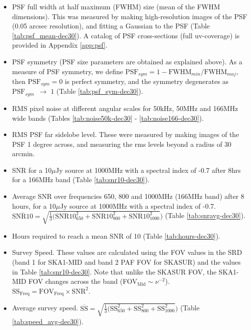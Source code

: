 \documentclass[sfheadings,a4paper,times,9pt,floats,floatfix]{article}
\begin{document}
\begin{itemize}
 \item PSF full width at half maximum (FWHM) size (mean of the FWHM dimensions). This was measured by making high-resolution
images of the PSF (0.05 arcsec resolution), and fitting a Gaussian to the PSF (Table \ref{tab:psf_mean-dec30}). A
catalog
of PSF
cross-sections (full uv-coverage) is provided in Appendix \ref{app:psf}.

 \item PSF symmetry (PSF size parameters are obtained as explained above). As a measure of PSF symmetry, we define 
$\text{PSF}_{sym}=1-\text{FWHM}_{min}/\text{FWHM}_{maj}$, then $\text{PSF}_{sym} = 0$ is perfect symmetry, and the symmetry
degenerates as $\text{PSF}_{sym}\,\,\, \rightarrow\,\,1$ (Table \ref{tab:psf_sym-dec30}).

 \item RMS pixel noise at different angular scales for 50kHz, 50MHz and 166MHz wide bands (Tables
\ref{tab:noise50k-dec30} -
\ref{tab:noise166-dec30}).

\item RMS PSF far sidelobe level. These were measured by making images of the PSF 1 degree across, and measuring
the rms levels beyond a radius of 30 arcmin.

 \item SNR for a 10$\mu$Jy source at 1000MHz with a spectral index of -0.7 after 8hrs for a 166MHz band (Table
\ref{tab:snr10-dec30}).
 
 \item Average SNR over frequencies 650, 800 and 1000MHz (166MHz band) after 8 hours, for a 10$\mu$Jy source at 1000MHz
with a
spectral index of -0.7. {$\overline{\text{SNR10}}=\sqrt{\frac{1}{3}(\text{SNR10}_{650}^2 + \text{SNR10}_{800}^2
+\text{SNR10}_{1000}^2})$} (Table \ref{tab:snravg-dec30}).

 \item Hours required to reach a mean SNR of 10 (Table \ref{tab:hours-dec30}).
 
 \item Survey Speed. These values are calculated using the FOV values in the SRD (band 1 for SKA1-MID and band 2 PAF FOV
for
SKASUR) and the values in Table \ref{tab:snr10-dec30}. Note that unlike the SKASUR FOV, the SKA1-MID FOV changes across
the band
(FOV$_{\text{Mid}}\sim \nu^{-2}$). $\text{SS}_\text{Freq} = \text{FOV}_\text{Freq}\times \text{SNR}^2$. 
 \item Average survey speed. {$\overline{\text{SS}} =\sqrt{\frac{1}{3}(\text{SS}_{650}^2 + \text{SS}_{800}^2
+\text{SS}_{1000}^2})$} (Table \ref{tab:speed_avg-dec30}).
\end{itemize}
\end{document}
